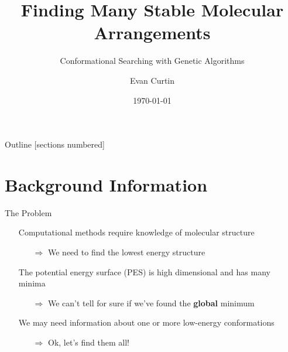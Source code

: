 \documentclass[10pt]{beamer}
\title{Finding Many Stable Molecular Arrangements}
\subtitle{Conformational Searching with Genetic Algorithms}
\date{\today}
\author{Evan Curtin}
\institute{University of Illinois at Urbana-Champaign}
\begin{document}
\maketitle

\begin{frame}{Outline}
  [sections numbered]
  \tableofcontents[hideallsubsections]
\end{frame}

\section{Background Information}

\begin{frame}[fragile]{The Problem}
	\begin{itemize}[<+->]
		\item[] {Computational methods require knowledge of molecular structure}
		\begin{itemize}
			\item[$\Rightarrow$] {We need to find the lowest energy structure}
		\end{itemize}
		\item[] {The potential energy surface (PES) is high dimensional and has many minima}
		\begin{itemize}
			\item[$\Rightarrow$] {We can't tell for sure if we've found the \alert{\textbf{global}} minimum}
		\end{itemize}
		\item[] {We may need information about one or more low-energy conformations}
		\begin{itemize}
			\item[$\Rightarrow$] {Ok, let's find them all!}
		\end{itemize}	
	\end{itemize}
\end{frame}
\end{document}
